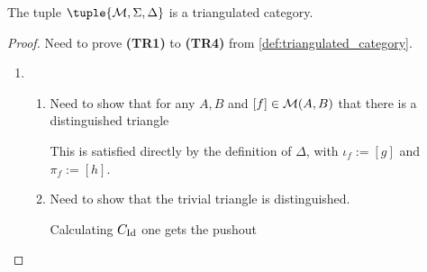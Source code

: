 
\begin{example}
    The tuple \( \tuple{\Mc, \Sigma, \Delta} \) is a triangulated category.
\end{example}
\begin{proof}
    Need to prove {\bf (TR1)} to {\bf (TR4)} from \autoref{def:triangulated_category}.

    \begin{enumerate}[label={(\bfseries TR\arabic*)}]
        \item {
            \begin{enumerate}
                \item {
                    Need to show that for any \( A, B \) and \( [f] \in {\mathcal{M}}(A, B) \) that there is a distinguished triangle
                    \begin{center}
                    \end{center}

                    This is satisfied directly by the definition of \( \Delta \), with \( \iota_f := [g] \) and \( \pi_f := [h] \).
                }
                \item {
                    Need to show that the trivial triangle is distinguished.

                    Calculating \( C_{\operatorname{Id}} \) one gets the pushout
                    \begin{center}
\end{center}}
\end{enumerate}}
\end{enumerate}
\end{proof}
